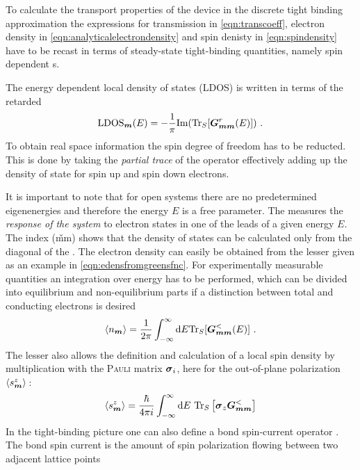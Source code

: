 To calculate the transport properties of the device in the discrete tight binding approximation the expressions for transmission in \cref{eqn:transcoeff}, electron density in \cref{eqn:analyticalelectrondensity} and spin denisty in \cref{eqn:spindensity} have to be recast in terms of steady-state tight-binding quantities, namely spin dependent \gfnc s.\par
The energy dependent local density of states (LDOS) is written in terms of the retarded \gfnc{} \cite{AnLunNik2008}
\begin{align}
\text{LDOS}_{\boldsymbol{m}}(E)=-\frac{1}{\pi} \text{Im}(\text{Tr}_S[\boldsymbol{G}_{\boldsymbol{mm}}^r(E)]) \ .
\label{eqn:ldos}
\end{align}
To obtain real space information the spin degree of freedom has to be reducted. This is done by taking the \emph{partial trace} \cite{Jacobs} of the operator effectively adding up the density of state for spin up and spin down electrons.\par
It is important to note that for open systems there are no predetermined eigenenergies and therefore the energy $E$ is a free parameter. The \gfnc{} measures the \emph{response of the system} to electron states in one of the leads of a given energy $E$. The index (\v{mm}) shows that the density of states can be calculated only from the diagonal of the \gfnc{}.
The electron density can easily be obtained from the lesser \gfnc{} given as an example in \cref{eqn:edensfromgreensfnc}. For experimentally measurable quantities an integration over energy has to be performed, which can be divided into equilibrium and non-equilibrium parts if a distinction between total and conducting electrons is desired
\begin{align}
	\expv{n_{\v{m}}} = \frac{1}{2\pi} \int_{-\infty}^{\infty}\text{d}E\text{Tr}_S[\mat{G}_{\v{mm}}^<(E)] \ .
	\label{eqn:gfncdensity}
\end{align}
The lesser \gfnc{} also allows the definition and calculation  of a local spin density by multiplication with the \textsc{Pauli} matrix $\boldsymbol{\sigma}_i$, here for the out-of-plane polarization $\left< s^z_{\boldsymbol{m}} \right>$\,\cite{Wimmer2009Thesis}:
\begin{align}
\left< s^z_{\boldsymbol{m}} \right> = \frac{\hbar}{4 \pi i} \int^{\infty}_{-\infty}\text{d}E\text{ Tr}_S\left[\boldsymbol{\sigma}_z\boldsymbol{G}^<_{\boldsymbol{mm}}\right]
\label{eqn:gfncspindensity}
\end{align}
In the tight-binding picture one can also define a bond spin-current operator \cite{EPL.80.47001}. The bond spin current is the amount of spin polarization flowing between two adjacent lattice points
